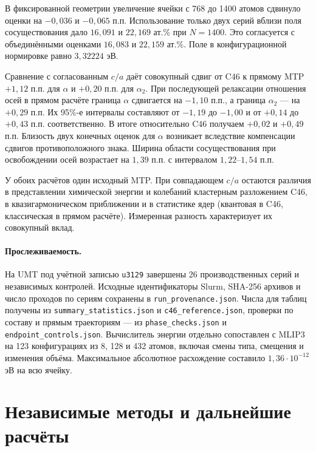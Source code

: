 \documentclass[11pt,a4paper]{article}
\begin{document}
В фиксированной геометрии увеличение ячейки с 768 до 1400 атомов
сдвинуло оценки на $-0{,}036$ и $-0{,}065$ п.п. Использование
только двух серий вблизи поля сосуществования дало
$16{,}091$ и $22{,}169$ ат.\% при $N=1400$. Это согласуется
с объединёнными оценками $16{,}083$ и $22{,}159$ ат.\%.
Поле в конфигурационной нормировке равно $3{,}32224$ эВ.

Сравнение с согласованным $c/a$ даёт совокупный сдвиг от C46
к прямому MTP $+1{,}12$ п.п. для $\alpha$ и $+0{,}20$ п.п.
для $\alpha_2$. При последующей релаксации отношения осей в прямом
расчёте граница $\alpha$ сдвигается на $-1{,}10$ п.п.,
а граница $\alpha_2$ --- на $+0{,}29$ п.п. Их 95\%-е интервалы
составляют от $-1{,}19$ до $-1{,}00$ и от $+0{,}14$ до
$+0{,}43$ п.п. соответственно.
В итоге относительно C46 получаем $+0{,}02$ и $+0{,}49$ п.п.
Близость двух конечных оценок для $\alpha$ возникает вследствие
компенсации сдвигов противоположного знака. Ширина области
сосуществования при освобождении осей возрастает на $1{,}39$ п.п.
с интервалом $1{,}22$--$1{,}54$ п.п.

У обоих расчётов один исходный MTP. При совпадающем $c/a$ остаются
различия в представлении химической энергии и колебаний
кластерным разложением C46, в квазигармоническом приближении и
в статистике ядер (квантовая в C46, классическая в прямом
расчёте). Измеренная разность характеризует их совокупный вклад.

\paragraph{Прослеживаемость.}
На UMT под учётной записью \texttt{u3129} завершены 26 производственных
серий и независимых контролей. Исходные идентификаторы Slurm,
SHA-256 архивов и число проходов по сериям сохранены в
\texttt{run\_provenance.json}. Числа для таблиц получены из
\texttt{summary\_statistics.json} и \texttt{c46\_reference.json},
проверки по составу и прямым траекториям ---
из \texttt{phase\_checks.json} и \texttt{endpoint\_controls.json}.
Вычислитель энергии отдельно сопоставлен с MLIP3 на 123 конфигурациях
из 8, 128 и 432 атомов, включая смены типа, смещения и изменения
объёма. Максимальное абсолютное расхождение составило
$1{,}36\cdot10^{-12}$ эВ на всю ячейку.

\section{Независимые методы и дальнейшие расчёты}
\label{sec:outlook}
\end{document}
